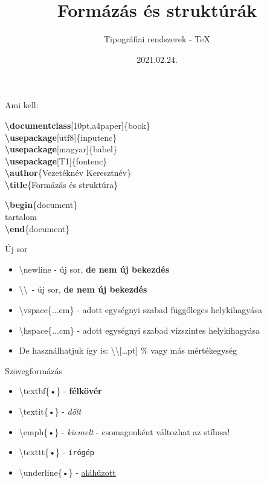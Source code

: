 \documentclass[11pt]{beamer}
\author{Tipográfiai rendszerek - \TeX}
\title{Formázás és struktúrák}
\date{2021.02.24.}
\newcommand{\tbs}{\textbackslash}
\begin{document}
 
 \begin{frame}
 \titlepage
 \end{frame}
 
\begin{frame}{Ami kell:}

\textbf{\tbs documentclass}[10pt,a4paper]\{book\} \\
\textbf{\tbs usepackage}[utf8]\{inputenc\} \\
\textbf{\tbs usepackage}[magyar]\{babel\} \\
\textbf{\tbs usepackage}[T1]\{fontenc\} \\
\textbf{\tbs author}\{Vezetéknév Keresztnév\} \\
\textbf{\tbs title}\{Formázás és struktúra\}

\vspace{1cm}

\textbf{\tbs begin}\{document\} \\
\hspace{1cm} tartalom \\
\textbf{\tbs end}\{document\}

\end{frame}
 
 
\begin{frame}{Új sor}
\begin{itemize}
 
\item \tbs newline - új sor, \textbf{de nem új bekezdés} 
\item \tbs \tbs \ - új sor, \textbf{de nem új bekezdés}
\item \tbs vspace\{...cm\} - adott egységnyi szabad függőleges helykihagyása
\item \tbs hspace\{...cm\} - adott egységnyi szabad vízszintes helykihagyása
\item De használhatjuk így is: \tbs \tbs [\dots pt] \% vagy más mértékegység
\end{itemize} 
\end{frame}

\begin{frame}{Szövegformázás}
\begin{itemize}
\item	\tbs textbf\{•\} - \textbf{félkövér}
\item 	\tbs textit\{•\} - \textit{dőlt}
\item   \tbs emph\{•\} - \emph{kiemelt} - csomagonként változhat az stílusa!
\item 	\tbs texttt\{•\} - \texttt{írógép}
\item   \tbs underline\{•\} - \underline{aláhúzott}
\end{itemize}
\end{frame}
\end{document}
